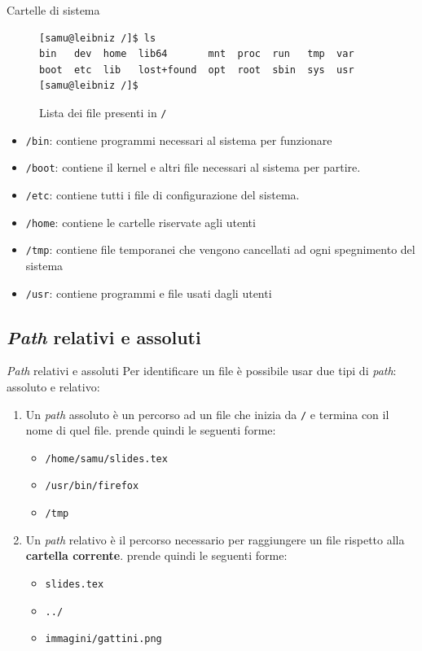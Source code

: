 \documentclass{beamer}
\begin{document}
\begin{frame}[fragile]{Cartelle di sistema}
  \begin{figure}
    \begin{lstlisting}[basicstyle=\footnotesize]
[samu@leibniz /]$ ls
bin   dev  home  lib64       mnt  proc  run   tmp  var
boot  etc  lib   lost+found  opt  root  sbin  sys  usr
[samu@leibniz /]$
    \end{lstlisting}
    \caption{Lista dei file presenti in \texttt{/}}
  \end{figure}
  \begin{itemize}
    \item \texttt{/bin}: contiene programmi necessari al sistema per funzionare
    \item \texttt{/boot}: contiene il kernel e altri file necessari al sistema
      per partire.
    \item \texttt{/etc}: contiene tutti i file di configurazione del sistema.
    \item \texttt{/home}: contiene le cartelle riservate agli utenti
    \item \texttt{/tmp}: contiene file temporanei che vengono cancellati ad ogni
      spegnimento del sistema
    \item \texttt{/usr}: contiene programmi e file usati dagli utenti
  \end{itemize}
\end{frame}

\subsection{\textit{Path} relativi e assoluti}
\begin{frame}{\textit{Path} relativi e assoluti}
  Per identificare un file è possibile usar due tipi di \textit{path}: assoluto 
  e relativo:
  \begin{enumerate}
    \item Un \textit{path} assoluto è un percorso ad un file che inizia da 
      \texttt{/} e termina con il nome di quel file. prende quindi le seguenti
      forme:
      \begin{itemize}
        \item \texttt{/home/samu/slides.tex}
        \item \texttt{/usr/bin/firefox}
        \item \texttt{/tmp}
      \end{itemize}
    \item Un \textit{path} relativo è il percorso necessario per raggiungere un
      file rispetto alla \textbf{cartella corrente}. prende quindi le seguenti
      forme:
      \begin{itemize}
        \item \texttt{slides.tex}
        \item \texttt{../}
        \item \texttt{immagini/gattini.png}
      \end{itemize}
  \end{enumerate}
\end{frame}
\end{document}

